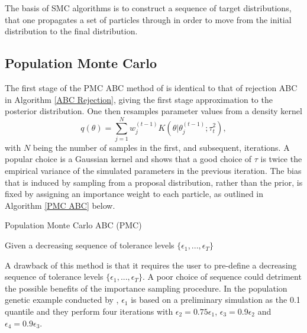 \documentclass[]{article}
\begin{document}
The basis of SMC algorithms is to construct a sequence of target distributions, that one propagates a set of particles through in order to move from the initial distribution to the final distribution. 

\subsection{Population Monte Carlo}

The first stage of the PMC ABC method of \cite{RN21} is identical to that of rejection ABC in Algorithm \ref{ABC Rejection}, giving the first stage approximation to the posterior distribution. One then resamples parameter values from a density kernel 
$$ q(\theta) = \sum_{j=1}^{N} w_j^{(t-1)} K(\theta| \theta_{j}^{(t-1)};\tau_t^2),$$ 
with $N$ being the number of samples in the first, and subsequent, iterations. A popular choice is a Gaussian kernel and \cite{RN21} shows that a good choice of $\tau$ is twice the empirical variance of the simulated parameters in the previous iteration. The bias that is induced by sampling from a proposal distribution, rather than the prior, is fixed by assigning an importance weight to each particle, as outlined in Algorithm \ref{PMC ABC} below. 


\begin{algorithm}[H]
	\label{PMC ABC}
	\caption{Population Monte Carlo ABC (PMC)}
	Given a decreasing sequence of tolerance levels $\{\epsilon_1, ..., \epsilon_T\}$\;
\end{algorithm}	

A drawback of this method is that it requires the user to pre-define a decreasing sequence of tolerance levels $\{\epsilon_1, ..., \epsilon_T\}$. A poor choice of sequence could detriment the possible benefits of the importance sampling procedure. In the population genetic example conducted by \cite{RN21}, $\epsilon_1$ is based on a preliminary simulation as the 0.1 quantile and they perform four iterations with $\epsilon_2 = 0.75\epsilon_1$, $\epsilon_3 = 0.9\epsilon_2$ and $\epsilon_4 = 0.9\epsilon_3$.
\end{document}
